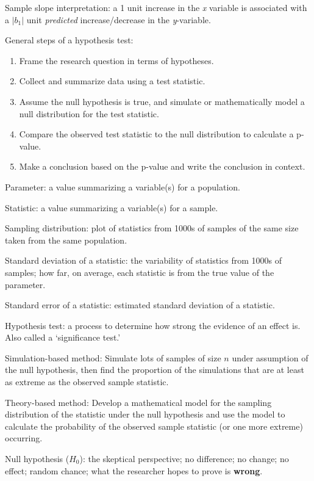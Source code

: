\documentclass[
]{report}
\begin{document}
Sample slope interpretation: a 1 unit increase in the \emph{x} variable is associated with a \(|b_1 |\) unit \emph{predicted} increase/decrease in the \emph{y}-variable.

General steps of a hypothesis test:

\begin{enumerate}
\def\labelenumi{\arabic{enumi}.}
\item
  Frame the research question in terms of hypotheses.
\item
  Collect and summarize data using a test statistic.
\item
  Assume the null hypothesis is true, and simulate or mathematically model a null distribution for the test statistic.
\item
  Compare the observed test statistic to the null distribution to calculate a p-value.
\item
  Make a conclusion based on the p-value and write the conclusion in context.
\end{enumerate}

Parameter: a value summarizing a variable(s) for a population.

Statistic: a value summarizing a variable(s) for a sample.

Sampling distribution: plot of statistics from 1000s of samples of the same size taken from the same population.

Standard deviation of a statistic: the variability of statistics from 1000s of samples; how far, on average, each statistic is from the true value of the parameter.

Standard error of a statistic: estimated standard deviation of a statistic.

Hypothesis test: a process to determine how strong the evidence of an effect is. Also called a `significance test.'

Simulation-based method: Simulate lots of samples of size \(n\) under assumption of the null hypothesis, then find the proportion of the simulations that are at least as extreme as the observed sample statistic.

Theory-based method: Develop a mathematical model for the sampling distribution of the statistic under the null hypothesis and use the model to calculate the probability of the observed sample statistic (or one more extreme) occurring.

Null hypothesis (\(H_0\)): the skeptical perspective; no difference; no change; no effect; random chance; what the researcher hopes to prove is \textbf{wrong}.
\end{document}

